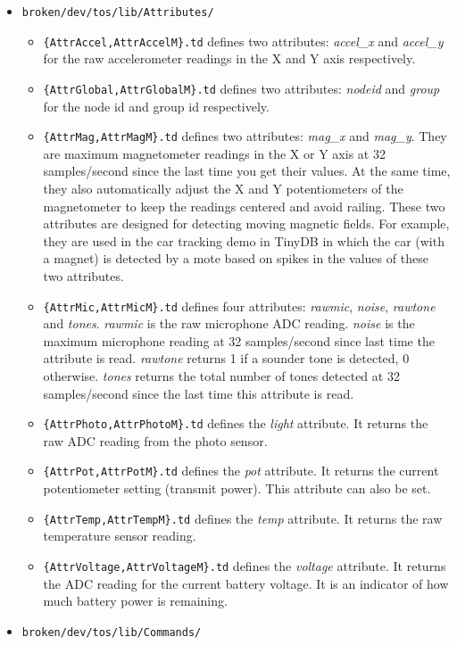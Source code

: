 \documentclass[11pt]{article}
\newcommand{\docroot}{broken/dev}
\begin{document}
\begin{itemize}
\item {\tt \docroot/tos/lib/Attributes/}
\begin{itemize}
\item {\tt \{AttrAccel,AttrAccelM\}.td} defines two attributes: {\em accel\_x}
and {\em accel\_y} for the raw accelerometer readings in the X and Y axis
respectively.
\item {\tt \{AttrGlobal,AttrGlobalM\}.td} defines two attributes: {\em nodeid}
and {\em group} for the node id and group id respectively.
\item {\tt \{AttrMag,AttrMagM\}.td} defines two attributes: {\em mag\_x}
and {\em mag\_y}.  They are maximum magnetometer readings in the X or Y axis
at 32 samples/second since the last time you get their values.  At the same
time, they also automatically adjust the X and Y potentiometers
of the magnetometer to keep the readings centered and avoid railing.
These two attributes are designed for detecting moving magnetic fields.
For example, they are used in the car tracking demo in TinyDB in which
the car (with a magnet) is detected by a mote based on spikes in
the values of these two attributes.
\item {\tt \{AttrMic,AttrMicM\}.td} defines four attributes: {\em rawmic},
{\em noise}, {\em rawtone} and {\em tones}.  {\em rawmic} is the raw
microphone ADC reading.  {\em noise} is the maximum microphone reading
at 32 samples/second since last time the attribute is read.  {\em rawtone}
returns 1 if a sounder tone is detected, 0 otherwise.  {\em tones} returns
the total number of tones detected at 32 samples/second since the last
time this attribute is read.
\item {\tt \{AttrPhoto,AttrPhotoM\}.td} defines the {\em light} attribute.
It returns the raw ADC reading from the photo sensor.
\item {\tt \{AttrPot,AttrPotM\}.td} defines the {\em pot} attribute.  It
returns the current potentiometer setting (transmit power).  
This attribute can also be set.
\item {\tt \{AttrTemp,AttrTempM\}.td} defines the {\em temp} attribute.  It
returns the raw temperature sensor reading.
\item {\tt \{AttrVoltage,AttrVoltageM\}.td} defines the {\em voltage} attribute.
It returns the ADC reading for the current battery voltage.  It is an indicator
of how much battery power is remaining.
\end{itemize}
\item {\tt \docroot/tos/lib/Commands/}

\end{itemize}
\end{document}
